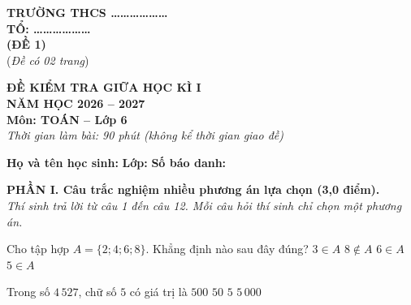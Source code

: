 
\noindent
\begin{minipage}[t]{6.5cm}
	\centering
	\textbf{TRƯỜNG THCS \dots\dots\dots\dots\dots\dots}\\[3pt]
	\textbf{TỔ: \dots\dots\dots\dots\dots\dots}\\[6pt]
	\textbf{(ĐỀ 1)}\\
	(\textit{Đề có 02 trang})
\end{minipage}%
\hfill
\begin{minipage}[t]{10.5cm}
	\centering
	\textbf{ĐỀ KIỂM TRA GIỮA HỌC KÌ I}\\[3pt]
	\textbf{NĂM HỌC 2026 -- 2027}\\[3pt]
	\textbf{Môn: TOÁN -- Lớp 6}\\[3pt]
	\textit{Thời gian làm bài: 90 phút (không kể thời gian giao đề)}
\end{minipage}

\vspace{10pt}

\noindent
\textbf{Họ và tên học sinh:} \dotfill{} \textbf{Lớp:} \makebox[2.5cm]{\dotfill} \textbf{Số báo danh:} \makebox[2.5cm]{\dotfill}

\vspace{10pt}

\noindent\textbf{PHẦN I. Câu trắc nghiệm nhiều phương án lựa chọn (3,0 điểm).}\\
\textit{Thí sinh trả lời từ câu 1 đến câu 12. Mỗi câu hỏi thí sinh chỉ chọn một phương án.}

\setcounter{ex}{0}

\begin{ex}%
	Cho tập hợp $A = \{2; 4; 6; 8\}$. Khẳng định nào sau đây đúng?
	\choice
	{$3 \in A$}
	{$8 \notin A$}
	{\True $6 \in A$}
	{$5 \in A$}
\end{ex}

\begin{ex}%
	Trong số $4\,527$, chữ số $5$ có giá trị là
	\choice
	{\True $500$}
	{$50$}
	{$5$}
	{$5\,000$}
\end{ex}

